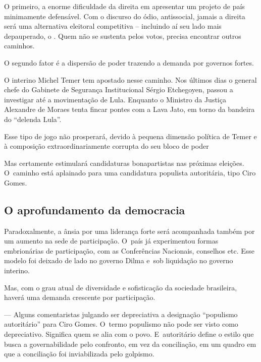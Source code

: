 O primeiro, a enorme dificuldade da direita em apresentar um projeto de
país minimamente defensável. Com o discurso do ódio, antissocial, jamais
a direita será uma alternativa eleitoral competitiva -- incluindo aí seu
lado mais depauperado, o . Quem não se sustenta pelos votos, precisa
encontrar outros caminhos.

O segundo fator é a dispersão de poder trazendo a demanda por governos
fortes.

O interino Michel Temer tem apostado nesse caminho. Nos últimos dias o
general chefe do Gabinete de Segurança Institucional Sérgio Etchegoyen,
passou a investigar até a movimentação de Lula. Enquanto o Ministro da
Justiça Alexandre de Moraes tenta fincar pontes com a Lava Jato, em
torno da bandeira do ``delenda Lula''.

Esse tipo de jogo não prosperará, devido à pequena dimensão política de
Temer e à composição extraordinariamente corrupta do seu bloco de poder

Mas certamente estimulará candidaturas bonapartistas nas próximas
eleições. O~caminho está aplainado para uma candidatura populista
autoritária, tipo Ciro Gomes.

\subsection{O aprofundamento da democracia}

Paradoxalmente, a ânsia por uma liderança forte será acompanhada também
por um aumento na sede de participação. O~país já experimentou formas
embrionárias de participação, com as Conferências Nacionais, conselhos
etc. Esse modelo foi deixado de lado no governo Dilma e~sob liquidação
no governo interino.

Mas, com o grau atual de diversidade e sofisticação da sociedade
brasileira, haverá uma demanda crescente por participação.

 --- Alguns comentaristas julgando ser depreciativa a designação
``populismo autoritário'' para Ciro Gomes. O~termo populismo não pode
ser visto como depreciativo. Significa quem se alia com o povo. E~autoritário define o estilo que busca a governabilidade pelo confronto,
em vez da conciliação, em um quadro em que a conciliação foi
inviabilizada pelo golpismo.
